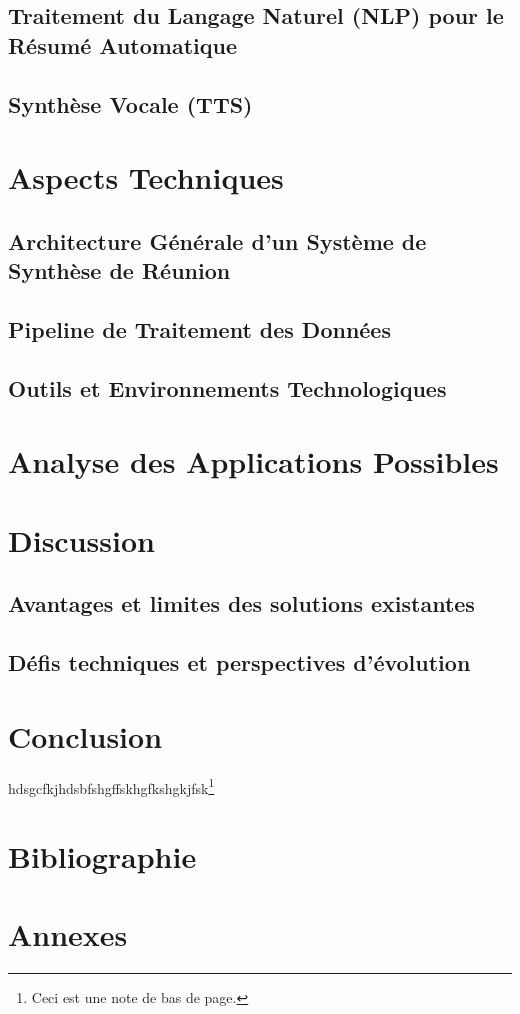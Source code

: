 \documentclass[12pt,a4paper]{report}
\begin{document}
\section{Traitement du Langage Naturel (NLP) pour le Résumé Automatique}
\section{Synthèse Vocale (TTS)}

\chapter{Aspects Techniques}
\section{Architecture Générale d’un Système de Synthèse de Réunion}
\section{Pipeline de Traitement des Données}
\section{Outils et Environnements Technologiques}

\chapter{Analyse des Applications Possibles}

\chapter{Discussion}
\section{Avantages et limites des solutions existantes}
\section{Défis techniques et perspectives d’évolution}

\chapter{Conclusion}
hdsgcfkjhdsbfshgffskhgfkshgkjfsk\footnote{Ceci est une note de bas de page.}

\chapter*{Bibliographie}

\chapter*{Annexes}
\end{document}

